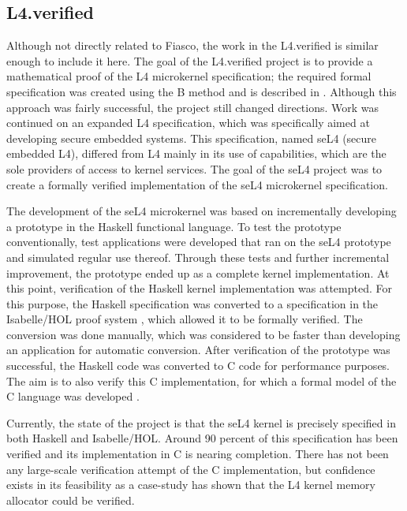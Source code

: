 \subsection{L4.verified}
Although not directly related to Fiasco, the work in the L4.verified is similar enough to include it here. The goal of the L4.verified project is to provide a mathematical proof of the L4 microkernel specification; the required formal specification was created using the B method \cite{sorensen01towards} and is described in \cite{kolanski06formalising}. Although this approach was fairly successful, the project still changed directions. Work was continued on an expanded L4 specification, which was specifically aimed at developing secure embedded systems. This specification, named seL4 (secure embedded L4), differed from L4 mainly in its use of capabilities, which are the sole providers of access to kernel services. The goal of the seL4 project was to create a formally verified implementation of the seL4 microkernel specification.\emptyline

The development of the seL4 microkernel was based on incrementally developing a prototype in the Haskell functional language. To test the prototype conventionally, test applications were developed that ran on the seL4 prototype and simulated regular use thereof. Through these tests and further incremental improvement, the prototype ended up as a complete kernel implementation. At this point, verification of the Haskell kernel implementation was attempted. For this purpose, the Haskell specification was converted to a specification in the Isabelle/HOL proof system \cite{nipkow02isabelle}, which allowed it to be formally verified. The conversion was done manually, which was considered to be faster than developing an application for automatic conversion. After verification of the prototype was successful, the Haskell code was converted to C code for performance purposes. The aim is to also verify this C implementation, for which a formal model of the C language was developed \cite{tuch07types}.\emptyline

Currently, the state of the project is that the seL4 kernel is precisely specified in both Haskell and Isabelle/HOL. Around 90 percent of this specification has been verified and its implementation in C is nearing completion. There has not been any large-scale verification attempt of the C implementation, but confidence exists in its feasibility as a case-study has shown that the L4 kernel memory allocator could be verified.